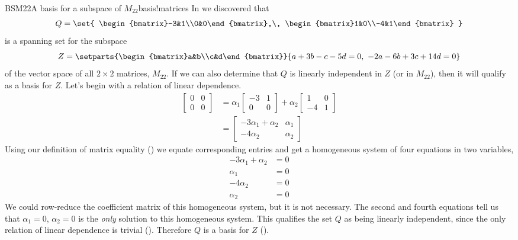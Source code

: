 %
\begin{example}{BSM22}{A basis for a subspace of $M_{22}$}{basis!matrices}
In  we discovered that
%
\begin{equation*}
Q=\set{
\begin{bmatrix}-3&1\\0&0\end{bmatrix},\,
\begin{bmatrix}1&0\\-4&1\end{bmatrix}
}
\end{equation*}
%
is a spanning set for the subspace
%
\begin{equation*}
Z=\setparts{\begin{bmatrix}a&b\\c&d\end{bmatrix}}{a+3b-c-5d=0,\ -2a-6b+3c+14d=0}
\end{equation*}
%
of the vector space of all $2\times 2$ matrices, $M_{22}$.  If we can also determine that $Q$ is linearly independent in $Z$ (or in $M_{22}$), then it will qualify as a basis for $Z$.  Let's begin with a relation of linear dependence.
%
\begin{align*}
\begin{bmatrix}0&0\\0&0\end{bmatrix}
&=
\alpha_1\begin{bmatrix}-3&1\\0&0\end{bmatrix}+
\alpha_2\begin{bmatrix}1&0\\-4&1\end{bmatrix}\\
&=\begin{bmatrix}
-3\alpha_1 +\alpha_2  & \alpha_1\\
-4\alpha_2 & \alpha_2
\end{bmatrix}
\end{align*}
%
Using our definition of matrix equality () we equate corresponding entries and get a homogeneous system of four equations in two variables,
%
\begin{align*}
-3\alpha_1 +\alpha_2&=0\\
\alpha_1&=0\\
-4\alpha_2&=0\\
\alpha_2&=0
\end{align*}
%
We could row-reduce the coefficient matrix of this homogeneous system, but it is not necessary.  The second and fourth equations tell us that $\alpha_1=0$, $\alpha_2=0$ is the {\em only} solution to this homogeneous system.  This qualifies the set $Q$ as being linearly independent, since the only relation of linear dependence is trivial ().  Therefore $Q$ is a basis for $Z$ ().
%
\end{example}
